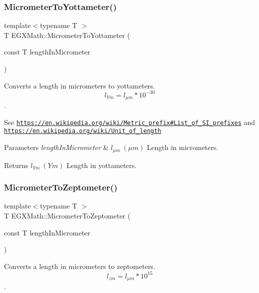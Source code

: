 \subsubsection{\texorpdfstring{Micrometer\+To\+Yottameter()}{MicrometerToYottameter()}}
{\footnotesize\ttfamily template$<$typename T $>$ \\
T E\+G\+X\+Math\+::\+Micrometer\+To\+Yottameter (\begin{DoxyParamCaption}\item[{const T}]{length\+In\+Micrometer }\end{DoxyParamCaption})}



Converts a length in micrometers to yottameters. \[ l_{Ym}=l_{\mu m} * 10^{-30} \]. 

See \href{https://en.wikipedia.org/wiki/Metric_prefix#List_of_SI_prefixes}{\tt https\+://en.\+wikipedia.\+org/wiki/\+Metric\+\_\+prefix\#\+List\+\_\+of\+\_\+\+S\+I\+\_\+prefixes} and \href{https://en.wikipedia.org/wiki/Unit_of_length}{\tt https\+://en.\+wikipedia.\+org/wiki/\+Unit\+\_\+of\+\_\+length} 
\begin{DoxyParams}{Parameters}
{\em length\+In\+Micrometer} & $ l_{\mu m}\ (\mu m)$ Length in micrometers. \\
\hline
\end{DoxyParams}
\begin{DoxyReturn}{Returns}
$ l_{Ym}\ (Ym)$ Length in yottameters. 
\end{DoxyReturn}
\mbox{\label{group___e_g_x_math-_conversions-_length_conversions-_micrometer-_s_i_ga34a06da7fb2b2f8791f5beefd4727be8}} 
\subsubsection{\texorpdfstring{Micrometer\+To\+Zeptometer()}{MicrometerToZeptometer()}}
{\footnotesize\ttfamily template$<$typename T $>$ \\
T E\+G\+X\+Math\+::\+Micrometer\+To\+Zeptometer (\begin{DoxyParamCaption}\item[{const T}]{length\+In\+Micrometer }\end{DoxyParamCaption})}



Converts a length in micrometers to zeptometers. \[ l_{zm}=l_{\mu m} * 10^{15} \]. 

